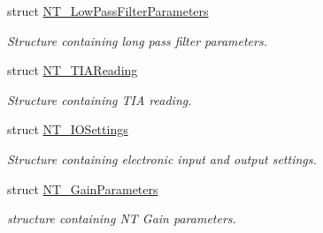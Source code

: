 \begin{DoxyCompactItemize}
struct \hyperlink{struct_n_t___low_pass_filter_parameters}{N\+T\+\_\+\+Low\+Pass\+Filter\+Parameters}
\begin{DoxyCompactList}\small\item\em Structure containing long pass filter parameters. \end{DoxyCompactList}\item 
struct \hyperlink{struct_n_t___t_i_a_reading}{N\+T\+\_\+\+T\+I\+A\+Reading}
\begin{DoxyCompactList}\small\item\em Structure containing T\+IA reading. \end{DoxyCompactList}\item 
struct \hyperlink{struct_n_t___i_o_settings}{N\+T\+\_\+\+I\+O\+Settings}
\begin{DoxyCompactList}\small\item\em Structure containing electronic input and output settings. \end{DoxyCompactList}\item 
struct \hyperlink{struct_n_t___gain_parameters}{N\+T\+\_\+\+Gain\+Parameters}
\begin{DoxyCompactList}\small\item\em structure containing NT Gain parameters. \end{DoxyCompactList}\end{DoxyCompactItemize}

